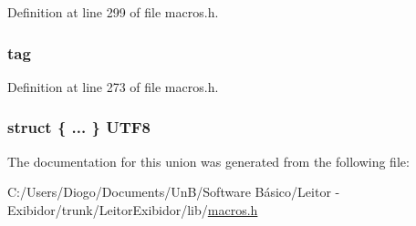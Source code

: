 Definition at line 299 of file macros.\+h.

\hypertarget{structcp__info_a17726ed17c64ec8550633ebf17fd1a98}{}
\subsubsection[{tag}]{ tag}\label{structcp__info_a17726ed17c64ec8550633ebf17fd1a98}


Definition at line 273 of file macros.\+h.

\hypertarget{structcp__info_aaa8259486ee517dc976e5aa38abee81e}{}
\subsubsection[{U\+T\+F8}]{\setlength{\rightskip}{0pt plus 5cm}struct \{ ... \}  U\+T\+F8}\label{structcp__info_aaa8259486ee517dc976e5aa38abee81e}


The documentation for this union was generated from the following file\+:\begin{DoxyCompactItemize}
\item 
C\+:/\+Users/\+Diogo/\+Documents/\+Un\+B/\+Software Básico/\+Leitor -\/ Exibidor/trunk/\+Leitor\+Exibidor/lib/\hyperlink{macros_8h}{macros.\+h}\end{DoxyCompactItemize}
